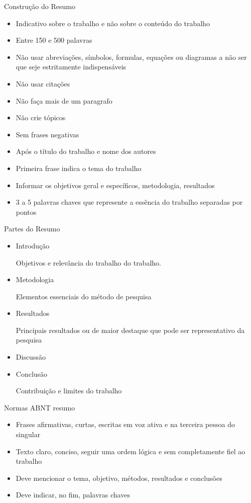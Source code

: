 \begin{resumo}
	\newpage
	{\fontsize{17}{0}\selectfont Construção do Resumo}
	\begin{itemize}
		\item Indicativo sobre o trabalho e não sobre o conteúdo do trabalho
		\item Entre 150 e 500 palavras
		\item Não usar abreviações, símbolos, formulas, equações ou diagramas a não ser que seje estritamente indispensáveis
		\item Não usar citações
		\item Não faça mais de um paragrafo
		\item Não crie tópicos
		\item Sem frases negativas
		\item Após o título do trabalho e nome dos autores
		\item Primeira frase indica o tema do trabalho
		\item Informar os objetivos geral e específicos, metodologia, resultados 
		\item 3 a 5 palavras chaves que represente a essência do trabalho separadas por pontos
	\end{itemize}

	{\fontsize{17}{0}\selectfont Partes do Resumo}
	\begin{itemize}
		\item Introdução

			Objetivos e relevância do trabalho do trabalho. 
		\item Metodologia

			Elementos essenciais do método de pesquisa
		\item Resultados

			Principais resultados ou de maior destaque que pode ser representativo da pesquisa
		\item Discussão
		\item Conclusão

			Contribuição e limites do trabalho
	\end{itemize}

{\fontsize{17}{0}\selectfont Normas ABNT resumo}
\begin{itemize}
	\item Frases afirmativas, curtas, escritas em voz ativa e na terceira pessoa do singular
	\item Texto claro, conciso, seguir uma ordem lógica e sem completamente fiel ao trabalho
	\item Deve mencionar o tema, objetivo, métodos, resultados e conclusões
	\item Deve indicar, no fim, palavras chaves
\end{itemize}

\end{resumo}

